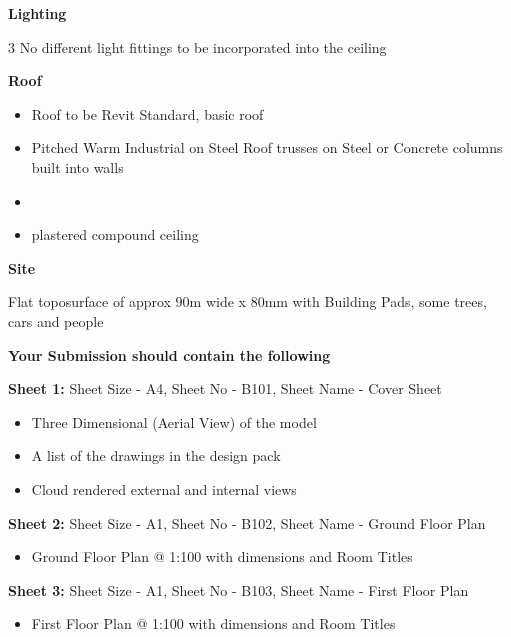 \begin{flushleft}
	\large\textbf{Lighting}\\
\end{flushleft}
3 No different light fittings to be incorporated into the ceiling


\begin{flushleft}
	\large\textbf{Roof}\\
\end{flushleft}
\begin{itemize}
	\item Roof to be Revit Standard, basic roof 
	\item Pitched Warm Industrial on Steel Roof trusses on Steel or Concrete columns built into walls
	\item 
	\item plastered compound ceiling
\end{itemize}

\begin{flushleft}
	\large\textbf{Site}\\
\end{flushleft}
Flat toposurface of approx 90m wide x 80mm with Building Pads, some trees, cars and people





\begin{flushleft}
	\Large\textbf{Your Submission should contain the following}\\
\end{flushleft}

\textbf{Sheet 1:} Sheet Size - A4, Sheet No - B101, Sheet Name - Cover Sheet
\begin{itemize}
	\item Three Dimensional (Aerial View) of the model
	\item A list of the drawings in the design pack
	\item Cloud rendered external and internal views
\end{itemize}


\textbf{Sheet 2:} Sheet Size - A1, Sheet No - B102, Sheet Name - Ground Floor Plan
\begin{itemize}
	\item Ground Floor Plan @ 1:100 with dimensions and Room Titles
\end{itemize}


\textbf{Sheet 3:} Sheet Size - A1, Sheet No - B103, Sheet Name - First Floor Plan
\begin{itemize}
	\item First Floor Plan @ 1:100 with dimensions and Room Titles
\end{itemize}



